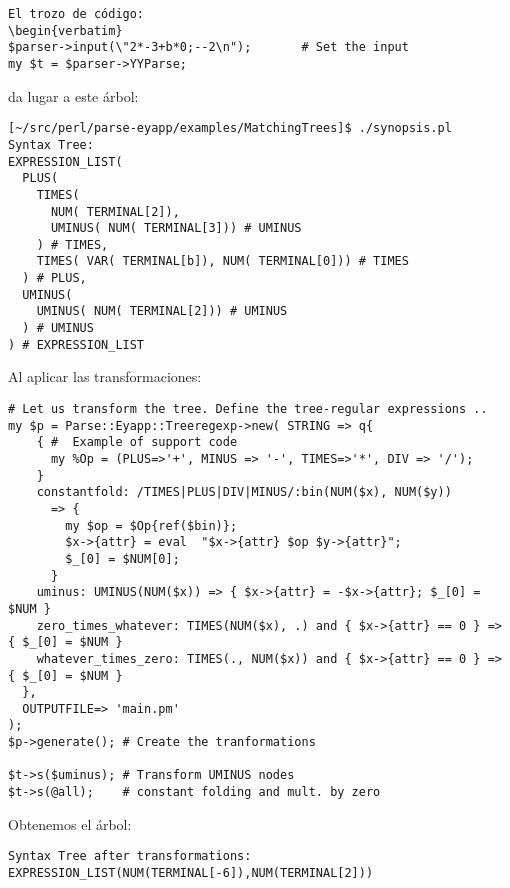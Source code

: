 \begin{verbatim}
El trozo de código:
\begin{verbatim}
$parser->input(\"2*-3+b*0;--2\n");       # Set the input
my $t = $parser->YYParse;        
\end{verbatim}
da lugar a este árbol:
\begin{verbatim}
[~/src/perl/parse-eyapp/examples/MatchingTrees]$ ./synopsis.pl 
Syntax Tree:
EXPRESSION_LIST(
  PLUS(
    TIMES(
      NUM( TERMINAL[2]),
      UMINUS( NUM( TERMINAL[3])) # UMINUS
    ) # TIMES,
    TIMES( VAR( TERMINAL[b]), NUM( TERMINAL[0])) # TIMES
  ) # PLUS,
  UMINUS(
    UMINUS( NUM( TERMINAL[2])) # UMINUS
  ) # UMINUS
) # EXPRESSION_LIST
\end{verbatim}
Al aplicar las transformaciones:
\begin{verbatim}
# Let us transform the tree. Define the tree-regular expressions ..
my $p = Parse::Eyapp::Treeregexp->new( STRING => q{
    { #  Example of support code
      my %Op = (PLUS=>'+', MINUS => '-', TIMES=>'*', DIV => '/');
    }
    constantfold: /TIMES|PLUS|DIV|MINUS/:bin(NUM($x), NUM($y)) 
      => { 
        my $op = $Op{ref($bin)};
        $x->{attr} = eval  "$x->{attr} $op $y->{attr}";
        $_[0] = $NUM[0]; 
      }
    uminus: UMINUS(NUM($x)) => { $x->{attr} = -$x->{attr}; $_[0] = $NUM }
    zero_times_whatever: TIMES(NUM($x), .) and { $x->{attr} == 0 } => { $_[0] = $NUM }
    whatever_times_zero: TIMES(., NUM($x)) and { $x->{attr} == 0 } => { $_[0] = $NUM }
  },
  OUTPUTFILE=> 'main.pm'
);
$p->generate(); # Create the tranformations

$t->s($uminus); # Transform UMINUS nodes
$t->s(@all);    # constant folding and mult. by zero
\end{verbatim}
Obtenemos el árbol:
\begin{verbatim}
Syntax Tree after transformations:
EXPRESSION_LIST(NUM(TERMINAL[-6]),NUM(TERMINAL[2]))
\end{verbatim}


